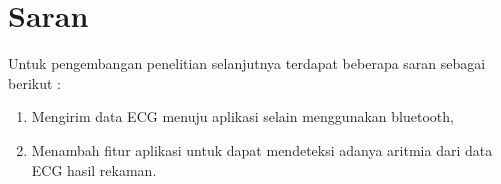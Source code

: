 \section{Saran}
\vspace{1ex}

Untuk pengembangan penelitian selanjutnya terdapat beberapa saran sebagai berikut :
\vspace{1ex}
\begin{enumerate}[nolistsep]
	\item Mengirim data ECG menuju aplikasi selain menggunakan bluetooth,
	\item Menambah fitur aplikasi untuk dapat mendeteksi adanya aritmia dari data ECG hasil rekaman.
\end{enumerate}

